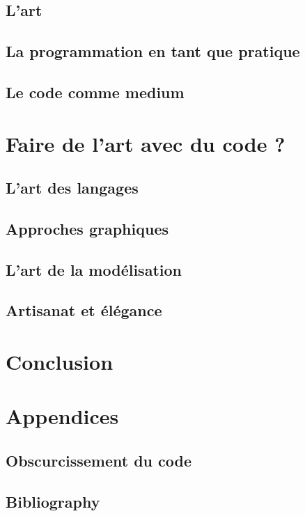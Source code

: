 \documentclass[12pt]{article} %
\begin{document}
\subsection{L'art}
\subsection{La programmation en tant que pratique}
\subsection{Le code comme medium}

\section{Faire de l'art avec du code ?}

\subsection{L'art des langages}
\subsection{Approches graphiques}
\subsection{L'art de la modélisation}
\subsection{Artisanat et élégance}




\section{Conclusion}

\newpage
\section{Appendices}

\subsection{Obscurcissement du code}



\printglossary[type=\acronymtype]
\printglossary


\newpage


\subsection{Bibliography} %


\restoregeometry
\end{document}
